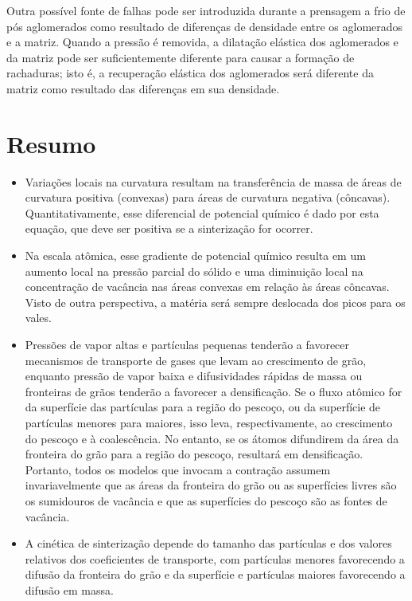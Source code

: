Outra possível fonte de falhas pode ser introduzida durante a prensagem a frio de pós aglomerados como resultado de diferenças de densidade entre os aglomerados e a matriz. Quando a pressão é removida, a dilatação elástica dos aglomerados e da matriz pode ser suficientemente diferente para causar a formação de rachaduras; isto é, a recuperação elástica dos aglomerados será diferente da matriz como resultado das diferenças em sua densidade.

\section*{Resumo}

\begin{itemize}
    \item Variações locais na curvatura resultam na transferência de massa de áreas de curvatura positiva (convexas) para áreas de curvatura negativa (côncavas). Quantitativamente, esse diferencial de potencial químico é dado por esta equação, que deve ser positiva se a sinterização for ocorrer.
    \item Na escala atômica, esse gradiente de potencial químico resulta em um aumento local na pressão parcial do sólido e uma diminuição local na concentração de vacância nas áreas convexas em relação às áreas côncavas. Visto de outra perspectiva, a matéria será sempre deslocada dos picos para os vales.
    \item Pressões de vapor altas e partículas pequenas tenderão a favorecer mecanismos de transporte de gases que levam ao crescimento de grão, enquanto pressão de vapor baixa e difusividades rápidas de massa ou fronteiras de grãos tenderão a favorecer a densificação. Se o fluxo atômico for da superfície das partículas para a região do pescoço, ou da superfície de partículas menores para maiores, isso leva, respectivamente, ao crescimento do pescoço e à coalescência. No entanto, se os átomos difundirem da área da fronteira do grão para a região do pescoço, resultará em densificação. Portanto, todos os modelos que invocam a contração assumem invariavelmente que as áreas da fronteira do grão ou as superfícies livres são os sumidouros de vacância e que as superfícies do pescoço são as fontes de vacância.
    \item A cinética de sinterização depende do tamanho das partículas e dos valores relativos dos coeficientes de transporte, com partículas menores favorecendo a difusão da fronteira do grão e da superfície e partículas maiores favorecendo a difusão em massa.

\end{itemize}
